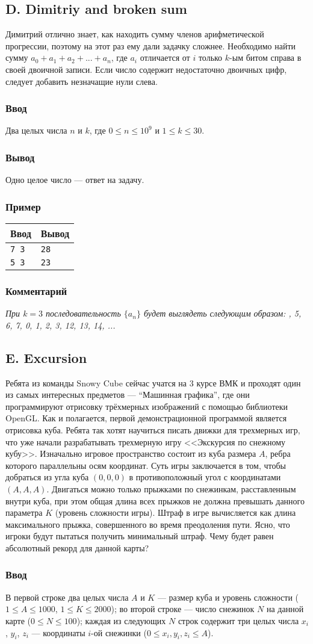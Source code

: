 \documentclass[10pt, a4paper]{article}
\newcommand{\informat}[1]
{
	\subsubsection*{Ввод} #1
}
\newcommand{\outformat}[1]
{
	\subsubsection*{Вывод} #1
}
\newcommand{\examplee}[4]
{
	\subsubsection*{Пример}
	\noindent
	\begin{center}
	\begin{tabularx}{\linewidth}{|X|X|}
	\hline
	Ввод 	& Вывод  	\\
	\hline
	{\tt #1} & {\tt #2}	\\
	\hline
	{\tt #3} & {\tt #4}	\\
	\hline
	\end{tabularx}
	\end{center}
}
\newcommand{\excomm}[1]
{
	\subsubsection*{Комментарий}
	\textit{#1}
}
\begin{document}
\subsection*{D. Dimitriy and broken sum}

Димитрий отлично знает, как находить сумму членов арифметической прогрессии, поэтому на этот раз ему дали задачку сложнее.
Необходимо найти сумму $a_0 + a_1 + a_2 + ... + a_n$, где $a_i$ отличается от $i$ только $k$-ым битом справа в своей двоичной записи. Если число содержит недостаточно двоичных цифр, следует добавить незначащие нули слева.

\informat{Два целых числа $n$ и $k$, где $0 \le n \le 10^9$ и $1 \le k \le 30$.}

\outformat{Одно целое число --- ответ на задачу.}

\examplee{7 3}{28}{5 3}{23}

\excomm{При $k = 3$ последовательность $\{a_n\}$ будет выглядеть следующим образом: \newline
4, 5, 6, 7, 0, 1, 2, 3, 12, 13, 14, ...}



\subsection*{E. Excursion}

Ребята из команды Snowy Cube сейчас учатся на 3 курсе ВМК и проходят один из самых интересных предметов --- “Машинная графика”, где они программируют отрисовку трёхмерных изображений с помощью библиотеки OpenGL. Как и полагается, первой демонстрационной программой является отрисовка куба. Ребята так хотят научиться писать движки для трехмерных игр, что уже начали разрабатывать трехмерную игру <<Экскурсия по снежному кубу>>. Изначально игровое пространство состоит из куба размера $A$, ребра которого параллельны осям координат. Суть игры заключается в том, чтобы добраться из угла куба $(0, 0, 0)$ в противоположный угол с координатами $(A, A, A)$. Двигаться можно только прыжками по снежинкам, расставленным внутри куба, при этом общая длина всех прыжков не должна превышать данного параметра $K$ (уровень сложности игры). Штраф в игре вычисляется как длина максимального прыжка, совершенного во время преодоления пути. Ясно, что игроки будут пытаться получить минимальный штраф. Чему будет равен абсолютный рекорд для данной карты? 

\informat{В первой строке два целых числа $A$ и $K$ --- размер куба и уровень сложности ($1 \le A \le 1000$, $1 \le K \le 2000$); \newline
во второй строке --- число снежинок $N$ на данной карте ($0 \le N \le 100$); \newline
каждая из следующих $N$ строк содержит три целых числа $x_i$, $y_i$, $z_i$ --- координаты $i$-ой снежинки ($0 \le x_i, y_i, z_i \le A$).}
\end{document}

